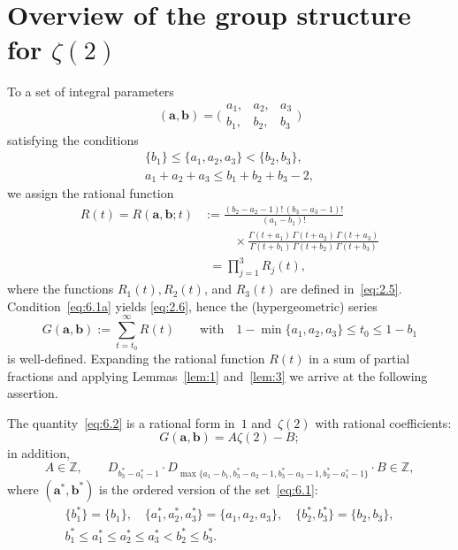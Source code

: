 \documentclass[a4paper,twoside]{article}
\numberwithin{equation}{section}
\renewcommand{\[}{\lfloor}
\renewcommand{\]}{\rfloor}
\newcommand{\<}{\langle}
\renewcommand{\>}{\rangle}
\newcommand{\rom}[1]{{\rm#1}}
\newcommand{\ba}{\boldsymbol a}
\newcommand{\bb}{\boldsymbol b}
\begin{document}
\section{Overview of the group structure for $\zeta(2)$}
\label{sec:6}
To a set of integral parameters
\begin{equation}
(\ba,\bb)
=\biggl(\begin{array}{rrr}
a_1, & a_2, & a_3 \\
b_1, & b_2, & b_3
\end{array}\biggr)
\label{eq:6.1}
\end{equation}
satisfying the conditions
\begin{gather}
\{b_1\}\le\{a_1,a_2,a_3\}<\{b_2,b_3\},
\nonumber\\
a_1+a_2+a_3\le b_1+b_2+b_3-2,
\label{eq:6.1a}
\end{gather}
we assign the rational function
\begin{align*}
R(t)
=R(\ba,\bb;t)
&:=\frac{(b_2-a_2-1)!\,(b_3-a_3-1)!}{(a_1-b_1)!}
\\ &\phantom:\qquad\times %
\frac{\Gamma(t+a_1)\,\Gamma(t+a_2)\,\Gamma(t+a_3)}
{\Gamma(t+b_1)\,\Gamma(t+b_2)\,\Gamma(t+b_3)}
\\ &\phantom:
=\prod_{j=1}^3R_j(t),
\end{align*}
where the functions $R_1(t),R_2(t)$, and $R_3(t)$ are defined
in~\eqref{eq:2.5}. Condition~\eqref{eq:6.1a} yields \eqref{eq:2.6},
hence the (hypergeometric) series
\begin{equation}
G(\ba,\bb):=\sum_{t=t_0}^\infty R(t)
\qquad\mbox{with}\quad
1-\min\{a_1,a_2,a_3\}\le t_0\le1-b_1
\label{eq:6.2}
\end{equation}
is well-defined. Expanding the rational function $R(t)$
in a sum of partial fractions
and applying Lemmas~\ref{lem:1} and~\ref{lem:3}
we arrive at the following assertion.

\begin{lemma}
\label{lem:13}
The quantity~\eqref{eq:6.2} is a rational form in~$1$ and~$\zeta(2)$
with rational coefficients\rom:
\begin{equation}
G(\ba,\bb)=A\zeta(2)-B;
\label{eq:6.3}
\end{equation}
in addition\rom,
$$
A\in\mathbb Z, \qquad
D_{b_3^*-a_1^*-1}
\cdot D_{\max\{a_1-b_1,b_3^*-a_2-1,b_3^*-a_3-1,b_2^*-a_1^*-1\}}
\cdot B\in\mathbb Z,
$$
where $(\ba^*,\bb^*)$ is the ordered version of the set~\eqref{eq:6.1}\rom:
\begin{equation}
\begin{gathered}
\{b_1^*\}=\{b_1\},
\quad
\{a_1^*,a_2^*,a_3^*\}=\{a_1,a_2,a_3\},
\quad
\{b_2^*,b_3^*\}=\{b_2,b_3\},
\\
b_1^*\le a_1^*\le a_2^*\le a_3^*<b_2^*\le b_3^*.
\end{gathered}
\label{eq:6.4}
\end{equation}
\end{lemma}
\end{document}
